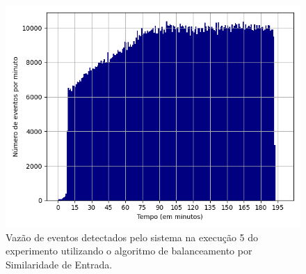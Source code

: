 


\begin{figure}[h]
\centering
\includegraphics[width=\textwidth]{figuras/graphics/histogram_vazao_10-dez-is.png}
\caption{Vazão de eventos detectados pelo sistema na execução 5 do experimento utilizando o algoritmo de balanceamento por Similaridade de Entrada.}
\label{fig:vazao_10-dez-is}
\end{figure}



